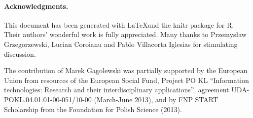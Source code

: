 \documentclass[11pt]{article}\usepackage[]{graphicx}\usepackage[]{color}
\newcommand{\package}[1]{\textsf{#1}\xspace}
\newcommand{\lang}[1]{\textsf{#1}\xspace}
\newcommand{\R}{\lang{R}}
\begin{document}
%

\paragraph{Acknowledgments.}
This document has been generated with \LaTeX and the \package{knitr}
package for \R.
Their authors' wonderful work is fully appreciated.
Many thanks to Przemys\l{}aw Grzegorzewski, Lucian Coroianu
and Pablo Villacorta Iglesias for stimulating discussion.



The contribution of Marek Gagolewski was partially supported
by the European Union from resources of the European Social Fund, Project PO KL
``Information technologies: Research and their interdisciplinary
applications'', agreement UDA-POKL.04.01.01-00-051/10-00 (March-June 2013),
and by FNP START Scholarship from the Foundation for Polish Science (2013).



% 
% 
\end{document}
